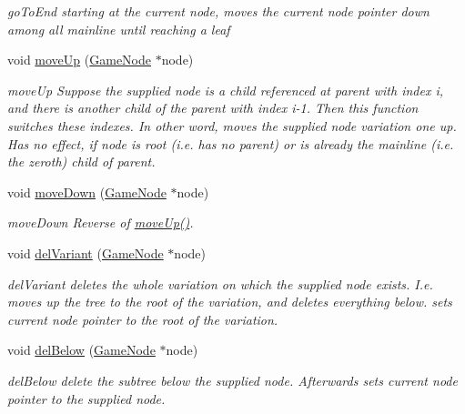 \begin{DoxyCompactItemize}
\begin{DoxyCompactList}\small\item\em go\-To\-End starting at the current node, moves the current node pointer down among all mainline until reaching a leaf \end{DoxyCompactList}\item 
void \hyperlink{classchess_1_1Game_a5232c5b68052202aa8167df619837912}{move\-Up} (\hyperlink{classchess_1_1GameNode}{Game\-Node} $\ast$node)
\begin{DoxyCompactList}\small\item\em move\-Up Suppose the supplied node is a child referenced at parent with index i, and there is another child of the parent with index i-\/1. Then this function switches these indexes. In other word, moves the supplied node variation one up. Has no effect, if node is root (i.\-e. has no parent) or is already the mainline (i.\-e. the zeroth) child of parent. \end{DoxyCompactList}\item 
void \hyperlink{classchess_1_1Game_a0c87b025f3d1aceaded403d62c40f567}{move\-Down} (\hyperlink{classchess_1_1GameNode}{Game\-Node} $\ast$node)
\begin{DoxyCompactList}\small\item\em move\-Down Reverse of \hyperlink{classchess_1_1Game_a5232c5b68052202aa8167df619837912}{move\-Up()}. \end{DoxyCompactList}\item 
void \hyperlink{classchess_1_1Game_aaca844dd847f3e163e9da9e990f30931}{del\-Variant} (\hyperlink{classchess_1_1GameNode}{Game\-Node} $\ast$node)
\begin{DoxyCompactList}\small\item\em del\-Variant deletes the whole variation on which the supplied node exists. I.\-e. moves up the tree to the root of the variation, and deletes everything below. sets current node pointer to the root of the variation. \end{DoxyCompactList}\item 
void \hyperlink{classchess_1_1Game_afb049584b03af5ce0d58f5feb6806a1f}{del\-Below} (\hyperlink{classchess_1_1GameNode}{Game\-Node} $\ast$node)
\begin{DoxyCompactList}\small\item\em del\-Below delete the subtree below the supplied node. Afterwards sets current node pointer to the supplied node. \end{DoxyCompactList}\item 

\end{DoxyCompactItemize}
